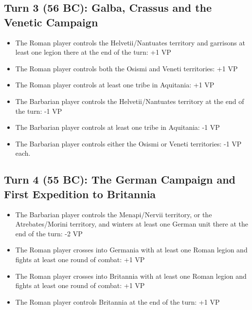 \subsection{Turn 3 (56 BC): Galba, Crassus and the Venetic Campaign}
\begin{itemize}
  \setlength\itemsep{0em}
  \item The Roman player controls the Helvetii/Nantuates territory and garrisons at least one legion there at the end of the turn: +1 VP
  \item The Roman player controls both the Osismi and Veneti territories: +1 VP
  \item The Roman player controls at least one tribe in Aquitania: +1 VP
  \item The Barbarian player controls the Helvetii/Nantuates territory at the end of the turn: -1 VP
  \item The Barbarian player controls at least one tribe in Aquitania: -1 VP
  \item The Barbarian player controls either the Osismi or Veneti territories: -1 VP each.
\end{itemize}

\subsection{Turn 4 (55 BC): The German Campaign and First Expedition to Britannia}
\begin{itemize}
  \setlength\itemsep{0em}
  \item The Barbarian player controls the Menapi/Nervii territory, or the Atrebates/Morini territory, and winters at least one German unit there at the end of the turn: -2 VP
  \item The Roman player crosses into Germania with at least one Roman legion and fights at least one round of combat: +1 VP
  \item The Roman player crosses into Britannia with at least one Roman legion and fights at least one round of combat: +1 VP
  \item The Roman player controls Britannia at the end of the turn: +1 VP
\end{itemize}

